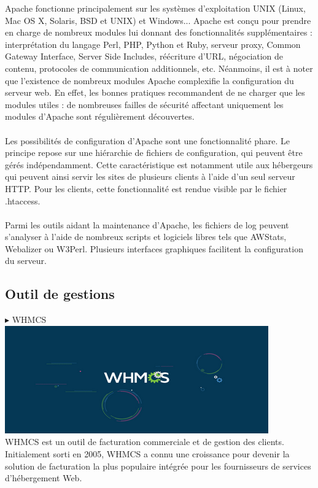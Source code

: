 \documentclass[a4paper, 12pt]{report}
\begin{document}
Apache fonctionne principalement sur les systèmes d'exploitation UNIX (Linux, Mac OS X, Solaris, BSD et UNIX) et Windows...
Apache est conçu pour prendre en charge de nombreux modules lui donnant des fonctionnalités supplémentaires : interprétation du langage Perl, PHP, Python et Ruby, serveur proxy, Common Gateway Interface, Server Side Includes, réécriture d'URL, négociation de contenu, protocoles de communication additionnels, etc. Néanmoins, il est à noter que l'existence de nombreux modules Apache complexifie la configuration du serveur web. En effet, les bonnes pratiques recommandent de ne charger que les modules utiles : de nombreuses failles de sécurité affectant uniquement les modules d'Apache sont régulièrement découvertes.
\\
\\
Les possibilités de configuration d'Apache sont une fonctionnalité phare. Le principe repose sur une hiérarchie de fichiers de configuration, qui peuvent être gérés indépendamment. Cette caractéristique est notamment utile aux hébergeurs qui peuvent ainsi servir les sites de plusieurs clients à l'aide d'un seul serveur HTTP. Pour les clients, cette fonctionnalité est rendue visible par le fichier .htaccess.
\\
\\
Parmi les outils aidant la maintenance d'Apache, les fichiers de log peuvent s'analyser à l'aide de nombreux scripts et logiciels libres tels que AWStats, Webalizer ou W3Perl. Plusieurs interfaces graphiques facilitent la configuration du serveur.
\subsection{Outil de gestions}
\noindent $\blacktriangleright$ WHMCS
\\
\includegraphics{img/outils/8}
\\
\noindent WHMCS est un outil de facturation commerciale et de gestion des clients. Initialement sorti en 2005, WHMCS a connu une croissance pour devenir la solution de facturation la plus populaire intégrée pour les fournisseurs de services d'hébergement Web.
\end{document}
